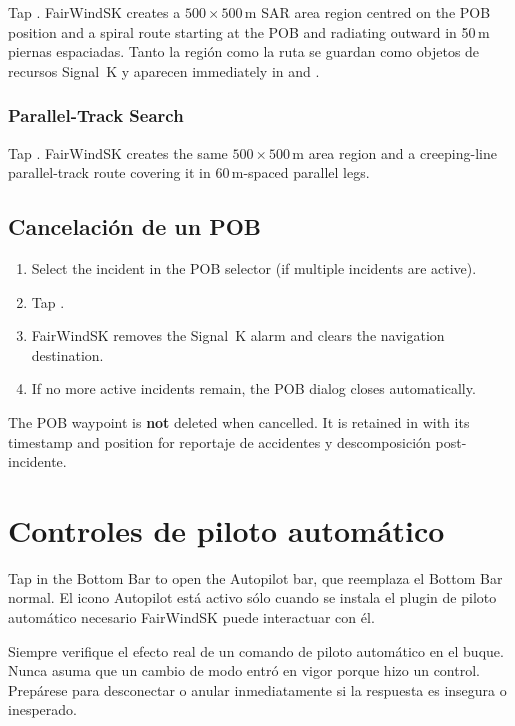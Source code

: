 Tap .
FairWindSK creates a $500 \times 500$\,m SAR area region centred on the POB
position and a spiral route starting at the POB and radiating outward in 50\,m
piernas espaciadas.
Tanto la región como la ruta se guardan como objetos de recursos Signal~K y aparecen
immediately in  and .

\subsection{Parallel-Track Search}

Tap .
FairWindSK creates the same $500 \times 500$\,m area region and a
creeping-line parallel-track route covering it in 60\,m-spaced parallel legs.

\section{Cancelación de un POB}

\begin{enumerate}
  \item Select the incident in the POB selector (if multiple incidents are active).
  \item Tap .
  \item FairWindSK removes the Signal~K alarm and clears the navigation destination.
  \item If no more active incidents remain, the POB dialog closes automatically.
\end{enumerate}

\begin{notebox}
The POB waypoint is \textbf{not} deleted when cancelled.
It is retained in  with its timestamp and position for
reportaje de accidentes y descomposición post-incidente.
\end{notebox}

\chapter{Controles de piloto automático}
\label{ch:autopilot}

Tap  in the Bottom Bar to open the Autopilot
bar, que reemplaza el Bottom Bar normal.
El icono Autopilot está activo sólo cuando se instala el plugin de piloto automático necesario
FairWindSK puede interactuar con él.

\begin{warningbox}
Siempre verifique el efecto real de un comando de piloto automático en el buque.
Nunca asuma que un cambio de modo entró en vigor porque hizo un control.
Prepárese para desconectar o anular inmediatamente si la respuesta es insegura o
inesperado.
\end{warningbox}

